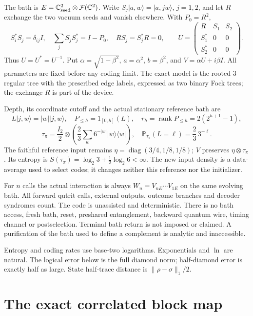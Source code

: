 \documentclass[11pt]{article}
\newcommand{\rank}{\operatorname{rank}}
\newcommand{\ket}[1]{\lvert #1\rangle}
\newcommand{\norm}[1]{\lVert #1\rVert}
\newcommand{\Prob}{\mathbb P}
\begin{document}
The bath is $E=\mathbb C^2_{\rm seed}\otimes\mathcal F(\mathbb C^2)$.
Write $S_j\ket{a,w}=\ket{a,jw}$, $j=1,2$, and let $R$ exchange the two
vacuum seeds and vanish elsewhere. With $P_0=R^2$,
\[
 S_i^*S_j=\delta_{ij}I,\quad \sum_jS_jS_j^*=I-P_0,
 \quad RS_j=S_j^*R=0,\qquad
 U=\begin{pmatrix}R&S_1&S_2\\S_1^*&0&0\\S_2^*&0&0\end{pmatrix}.
 \tag{2}
\]
Thus $U=U^*=U^{-1}$. Put $\alpha=\sqrt{1-\beta^2}$,
$a=\alpha^2$, $b=\beta^2$, and $V=\alpha U+i\beta I$.
All parameters are fixed before any coding limit. The exact model is the
rooted 3-regular tree with the prescribed edge labels, expressed as two binary
Fock trees; the exchange $R$ is part of the device.

Depth, its coordinate cutoff and the actual stationary reference bath are
\[
 L\ket{j,w}=|w|\ket{j,w},\quad P_{\le h}=1_{[0,h]}(L),\quad
 r_h=\rank P_{\le h}=2(2^{h+1}-1),
 \tag{3}
\]
\[
 \tau_\pi=\frac{I_2}{2}\otimes\left(\frac23\sum_w6^{-|w|}
 |w\rangle\langle w|\right),\quad
 \Prob_{\tau_\pi}(L=\ell)=\frac23\,3^{-\ell}.
 \tag{4}
\]
The faithful reference input remains $\eta=\operatorname{diag}(3/4,1/8,1/8)$;
$V$ preserves $\eta\otimes\tau_\pi$. Its entropy is
$S(\tau_\pi)=\log_2 3+\frac12\log_2 6<\infty$.
The new input density is a data-average used to select codes; it changes
neither this reference nor the initializer.

For $n$ calls the actual interaction is always
$W_n=V_{nE}\cdots V_{1E}$ on the same evolving bath. All forward qutrit calls,
external outputs, outcome branches and decoder syndromes count. The code is
unassisted and deterministic. There is no bath access, fresh bath, reset,
preshared entanglement, backward quantum wire, timing channel or postselection.
Terminal bath return is not imposed or claimed. A purification of the bath
used to define a complement is analytic and inaccessible.

Entropy and coding rates use base-two logarithms. Exponentials and $\ln$ are
natural. The logical error below is the full diamond norm; half-diamond error
is exactly half as large. State half-trace distance is $\norm{\rho-\sigma}_1/2$.

\section{The exact correlated block map}
\end{document}
